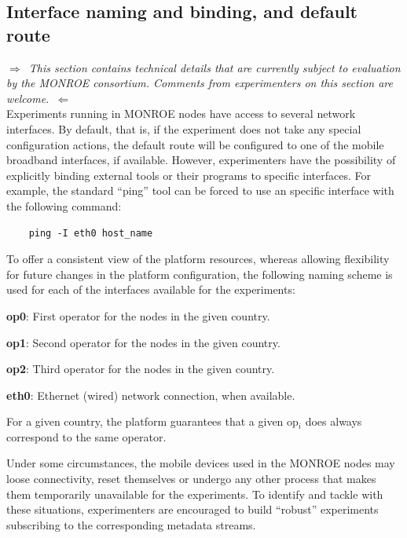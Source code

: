 \documentclass[a4paper,10pt]{article}
\newcommand{\VerbatimFont}{\footnotesize}
\newcommand{\monroe}{MONROE}
\begin{document}
\subsection{Interface naming and binding, and default route}
\label{subsec:interfaceNaming}

$\Rightarrow$~\emph{This section contains technical details that are currently subject to evaluation by the \monroe{} consortium. Comments from experimenters on this section are welcome.}~$\Leftarrow$\\

Experiments running in \monroe{} nodes have access to several network interfaces.
By default, that is, if the experiment does not take any special configuration actions, the default route will be configured to one of the mobile broadband interfaces, if available.
However, experimenters have the possibility of explicitly binding external tools or their programs to specific interfaces.
For example, the standard ``ping'' tool can be forced to use an specific interface with the following command:
{\VerbatimFont
\begin{verbatim}
	ping -I eth0 host_name
\end{verbatim}}

To offer a consistent view of the platform resources, whereas allowing flexibility for future changes in the platform configuration, the following naming scheme is used for each of the interfaces available for the experiments:
\begin{enumerate*}
	\item [\textbf{op0}:] First operator for the nodes in the given country.%
	\item [\textbf{op1}:] Second operator for the nodes in the given country.%
	\item [\textbf{op2}:] Third operator for the nodes in the given country.%
	\item [\textbf{eth0}:] Ethernet (wired) network connection, when available.
\end{enumerate*}
For a given country, the platform guarantees that a given op$_i$ does always correspond to the same operator.

Under some circumstances, the mobile devices used in the \monroe{} nodes may loose connectivity, reset themselves or undergo any other process that makes them temporarily unavailable for the experiments.
To identify and tackle with these situations, experimenters are encouraged to build ``robust'' experiments subscribing to the corresponding metadata streams.
\end{document}
